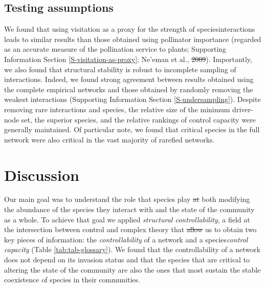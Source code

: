 \documentclass[a4paper]{artikel1}
\newcommand{\R}[1]{\label{#1}\linelabel{#1}}
\theoremstyle{definition}
\theoremstyle{definition}
\theoremstyle{definition}
\theoremstyle{remark}
\providecommand{\DIFaddtex}[1]{{\protect\color{blue}\uwave{#1}}} %
\providecommand{\DIFdeltex}[1]{{\protect\color{red}\sout{#1}}}                      %
\providecommand{\DIFaddbegin}{} %
\providecommand{\DIFaddend}{} %
\providecommand{\DIFdelbegin}{} %
\providecommand{\DIFdelend}{} %
\providecommand{\DIFadd}[1]{\texorpdfstring{\DIFaddtex{#1}}{#1}} %
\providecommand{\DIFdel}[1]{\texorpdfstring{\DIFdeltex{#1}}{}} %
\begin{document}
\subsection{Testing assumptions}\label{testing-assumptions-1}

\DIFdelbegin %
\DIFdelend We found that using visitation as a proxy for the strength of species\DIFaddbegin \DIFadd{'
}\DIFaddend interactions leads to similar results than those obtained using
pollinator importance (regarded as an accurate measure of the
pollination service to plants; Supporting Information Section
\ref{S-visitation-as-proxy}; Ne'eman et al., \DIFdelbegin \DIFdel{2009}\DIFdelend \DIFaddbegin \DIFadd{2010}\DIFaddend ). Importantly, we also
found that structural stability is robust to incomplete sampling of
interactions. Indeed, we found strong agreement between results obtained
using the complete empirical networks and those obtained by randomly
removing the weakest interactions (Supporting Information Section
\ref{S-undersampling}). Despite removing rare interactions and species,
the relative size of the minimum driver-node set, the superior species,
and the relative rankings of control capacity were generally maintained.
Of particular note, we found that critical species in the full network
were also critical in the vast majority of rarefied networks.

\section{Discussion}\label{discussion}

Our main goal was to understand the role that species play \DIFdelbegin \DIFdel{at }\DIFdelend \DIFaddbegin \DIFadd{in }\DIFaddend both
modifying the abundance of the species they interact with and the state
of the community as a whole. To achieve that goal we applied
\emph{structural controllability}, a field at the intersection between
control and complex theory that \DIFdelbegin \DIFdel{allow }\DIFdelend \DIFaddbegin \DIFadd{allowed }\DIFaddend us to obtain two key pieces of
information: the \emph{controllability} of a network and a species\DIFaddbegin \DIFadd{'
}\DIFaddend \emph{control capacity} (Table \ref{tab:tab-glossary}). We found that
the controllability of a network does not depend on its invasion status
and that the species that are critical to altering the state of the
community are also the ones that most sustain the stable coexistence of
species in their communities.
\end{document}
